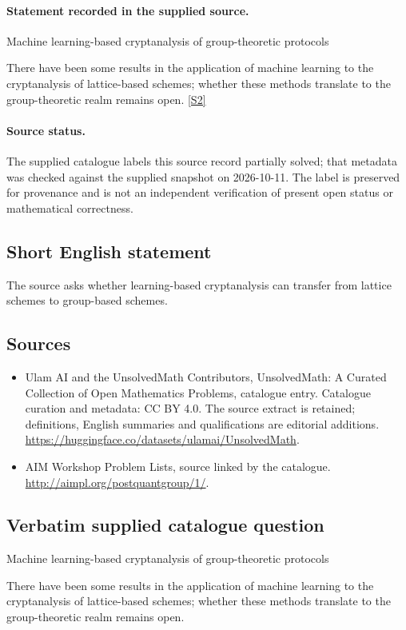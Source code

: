 \documentclass[11pt]{article}
\begin{document}
\paragraph{Statement recorded in the supplied source.}
Machine learning-based cryptanalysis of group-theoretic protocols

There have been some results in the application of machine learning to the cryptanalysis of lattice-based schemes; whether these methods translate to the group-theoretic realm remains open. \href{http://aimpl.org/postquantgroup/1/}{[S2]}
\paragraph{Source status.}
The supplied catalogue labels this source record partially solved; that metadata was checked against the supplied snapshot on 2026-10-11. The label is preserved for provenance and is not an independent verification of present open status or mathematical correctness.
\subsection{Short English statement}
The source asks whether learning-based cryptanalysis can transfer from lattice schemes to group-based schemes.
\subsection{Sources}
\begin{itemize}
\item[S1] Ulam AI and the UnsolvedMath Contributors, UnsolvedMath: A Curated Collection of Open Mathematics Problems, catalogue entry. Catalogue curation and metadata: CC BY 4.0. The source extract is retained; definitions, English summaries and qualifications are editorial additions.
\url{https://huggingface.co/datasets/ulamai/UnsolvedMath}.
\item[S2] AIM Workshop Problem Lists, source linked by the catalogue.
\url{http://aimpl.org/postquantgroup/1/}.
\end{itemize}
\subsection{Verbatim supplied catalogue question}
Machine learning-based cryptanalysis of group-theoretic protocols

There have been some results in the application of machine learning to the cryptanalysis of lattice-based schemes; whether these methods translate to the group-theoretic realm remains open.
\end{document}
